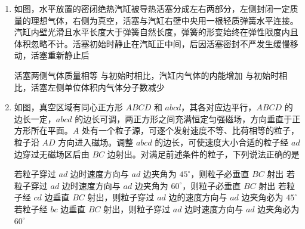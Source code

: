 \documentclass[\gkver]{gaokaozhenti}
\begin{document}
\begin{enumerate}
{故选 BD。
}

\item
如图，水平放置的密闭绝热汽缸被导热活塞分成左右两部分，左侧封闭一定质量的理想气体，右侧为真空，活塞与汽缸右壁中央用一根轻质弹簧水平连接。汽缸内壁光滑且水平长度大于弹簧自然长度，弹簧的形变始终在弹性限度内且体积忽略不计。活塞初始时静止在汽缸正中间，后因活塞密封不严发生缓慢移动，活塞重新静止后


{活塞两侧气体质量相等}
{与初始时相比，汽缸内气体的内能增加}
{与初始时相比，活塞左侧单位体积内气体分子数减少}


\item
如图，真空区域有同心正方形 $ABCD$ 和 $abcd$，其各对应边平行，$ABCD$ 的边长一定，$abcd$ 的边长可调，两正方形之间充满恒定匀强磁场，方向垂直于正方形所在平面。$A$ 处有一个粒子源，可逐个发射速度不等、比荷相等的粒子，粒子沿 $AD$ 方向进入磁场。调整 $abcd$ 的边长，可使速度大小合适的粒子经 $ad$ 边穿过无磁场区后由 $BC$ 边射出。对满足前述条件的粒子，下列说法正确的是


\fourchoices
{若粒子穿过 $ad$ 边时速度方向与 $ad$ 边夹角为 $45^\circ$，则粒子必垂直 $BC$ 射出}
{若粒子穿过 $ad$ 边时速度方向与 $ad$ 边夹角为 $60^\circ$，则粒子必垂直 $BC$ 射出}
{若粒子经 $cd$ 边垂直 $BC$ 射出，则粒子穿过 $ad$ 边的速度方向与 $ad$ 边夹角必为 $45^\circ$}
{若粒子经 $bc$ 边垂直 $BC$ 射出，则粒子穿过 $ad$ 边时速度方向与 $ad$ 边夹角必为 $60^\circ$}


\end{enumerate}
\end{document}
